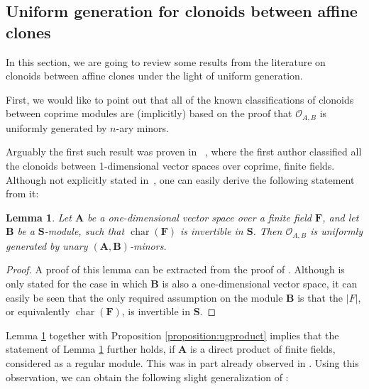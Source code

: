 \documentclass[11pt]{amsart}
\theoremstyle{plain}
\newtheorem{lemma}[thm]{Lemma}
\theoremstyle{definition}
\newcommand{\F}{{\mathbf F}}
\newcommand{\alg}[1]{\mathbf{#1}}
\newcommand{\clonoid}[1]{\mathcal{#1}}
\newcommand{\clodO}{\clonoid{O}}
\newcommand{\algA}{\alg{A}}
\newcommand{\algB}{\alg{B}}
\newcommand{\algS}{\alg{S}}
\DeclareMathOperator{\chars}{char}
\begin{document}
\subsection{Uniform generation for clonoids between affine clones}

In this section, we are going to review some results from the literature on clonoids between affine clones under the light of uniform generation. 


First, we would like to point out that all of the known classifications of clonoids between coprime modules are (implicitly) based on the proof that $\clodO_{A,B}$ is uniformly generated by $n$-ary minors. 

Arguably the first such result was proven in ~\cite{fioravanti-clonoids}, where the first author classified all the clonoids between 1-dimensional vector spaces over coprime, finite fields. Although not explicitly stated in~\cite{fioravanti-clonoids}, one can easily derive the following statement from it:

\begin{lemma} \label{lemma:onedim}
Let $\algA$ be a one-dimensional vector space over a finite field $\F$, and let $\algB$ be a $\algS$-module, such that $\chars(\F)$ is invertible in $\algS$. Then $\clodO_{A,B}$ is uniformly generated by unary $(\algA,\algB)$-minors.
\end{lemma}

\begin{proof}
A proof of this lemma can be extracted from the proof of \cite[Theorem 4.3.]{fioravanti-clonoids}. Although \cite[Theorem 4.3.]{fioravanti-clonoids} is only stated for the case in which $\algB$ is also a one-dimensional vector space, it can easily be seen that the only required assumption on the module $\algB$ is that the $|F|$, or equivalently $\chars(\F)$, is invertible in $\algS$.
\end{proof}

Lemma \ref{lemma:onedim} together with Proposition \ref{proposition:ugproduct} implies that the statement of Lemma \ref{lemma:onedim} further holds, if $\algA$ is a direct product of finite fields, considered as a regular module. This was in part already observed in \cite{fioravanti-clonoidsproducts}. Using this observation, we can obtain the following slight generalization of \cite[Theorem 1.5.]{MW-clonoidsmodules}:
\end{document}
